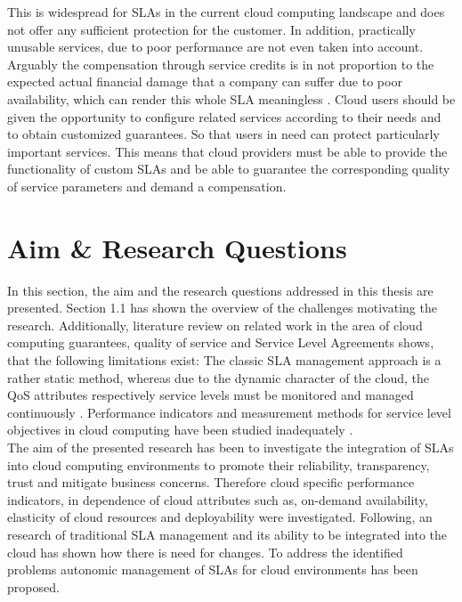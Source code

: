 This is widespread for SLAs in the current cloud computing landscape  \cite{CloudSLAwhite}   \cite{Baset:2012:CSP:2331576.2331586} and does not offer any sufficient protection for the customer. In addition, practically unusable services, due to poor performance are not even taken into account. Arguably the compensation  through service credits is in not proportion to the expected actual financial damage that a company can suffer due to poor availability, which can render this whole SLA meaningless  \cite{meaning}. Cloud users should be given the opportunity to configure related services according to their needs and to obtain customized guarantees. So that users in need can protect particularly important services. This means that cloud providers must be able to provide the functionality of custom SLAs and be able to guarantee the corresponding quality of service parameters and demand a compensation. 



\section{Aim \& Research Questions}

In this section, the  aim and the research questions addressed in this thesis are presented.  Section 1.1 has shown the overview of the challenges motivating the research. Additionally, literature review on related work in the area of cloud computing guarantees, quality of service  and Service Level Agreements shows, that the following limitations exist: The classic SLA management approach is a rather static method, whereas due to the dynamic character of the cloud, the QoS attributes respectively service levels must be monitored and managed continuously \cite{Ludwig03WSLA}. Performance indicators \cite{5557978} and measurement methods for service level objectives in cloud computing have been studied inadequately \cite{Wieder2011}.
\\
The aim of the presented research has been to investigate the integration of SLAs into cloud computing environments to promote their reliability, transparency, trust and mitigate business concerns. Therefore cloud specific performance indicators, in dependence of cloud attributes such as, on-demand availability, elasticity of cloud resources and deployability were investigated. Following, an research of traditional SLA management and its ability to be integrated into the cloud has shown how there is need for changes. To address the identified problems  autonomic management of SLAs for cloud environments has been proposed.

